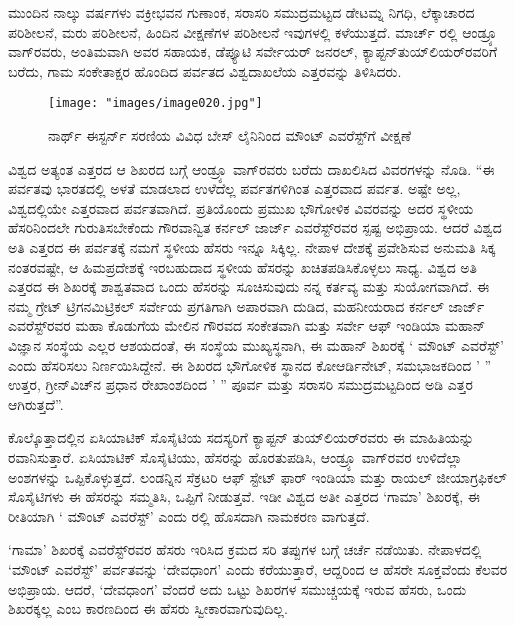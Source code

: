 ಮುಂದಿನ ನಾಲ್ಕು ವರ್ಷಗಳು ವಕ್ರೀಭವನ ಗುಣಾಂಕ, ಸರಾಸರಿ ಸಮುದ್ರಮಟ್ಟದ ಡೇಟಮ್ನ ನಿಗಧಿ, ಲೆಕ್ಕಾಚಾರದ ಪರಿಶೀಲನೆ, ಮರು ಪರಿಶೀಲನೆ, ಹಿಂದಿನ ವೀಕ್ಷಣೆಗಳ ಪರಿಶೀಲನೆ ಇವುಗಳಲ್ಲಿ ಕಳೆಯುತ್ತದೆ. ಮಾರ್ಚ್ ರಲ್ಲಿ ಆಂಡ್ರ್ಯೂ ವಾಗ್​ರವರು, ಅಂತಿಮವಾಗಿ ಅವರ ಸಹಾಯಕ, ಡೆಪ್ಯೂಟಿ ಸರ್ವೇಯರ್​ ಜನರಲ್​, ಕ್ಯಾಪ್ಟನ್​ ತುಯ್​ಲಿಯರ್​\break ರವರಿಗೆ ಬರೆದು, ಗಾಮ ಸಂಕೇತಾಕ್ಷರ ಹೊಂದಿದ ಪರ್ವತದ ವಿಶ್ವದಾಖಲೆಯ ಎತ್ತರವನ್ನು ತಿಳಿಸಿದರು.

\begin{figure}[!htbp]
\texttt{[image: "images/image020.jpg"]}
\caption{ನಾರ್ಥ್ ಈಸ್ಟರ್ನ್ ಸರಣಿಯ ವಿವಿಧ ಬೇಸ್​ ಲೈನಿನಿಂದ ಮೌಂಟ್​ ಎವರೆಸ್ಟ್​ಗೆ ವೀಕ್ಷಣೆ}\label{art15-fig2}
\end{figure}

ವಿಶ್ವದ ಅತ್ಯಂತ ಎತ್ತರದ ಆ ಶಿಖರದ ಬಗ್ಗೆ ಆಂಡ್ರ್ಯೂ ವಾಗ್​ರವರು ಬರೆದು ದಾಖಲಿಸಿದ ವಿವರಗಳನ್ನು ನೊಡಿ. “ಈ ಪರ್ವತವು ಭಾರತದಲ್ಲಿ ಅಳತೆ ಮಾಡಲಾದ ಉಳೆದೆಲ್ಲ ಪರ್ವತಗಳಿಗಿಂತ ಎತ್ತರವಾದ ಪರ್ವತ. ಅಷ್ಟೇ ಅಲ್ಲ, ವಿಶ್ವದಲ್ಲಿಯೇ ಎತ್ತರವಾದ ಪರ್ವತವಾಗಿದೆ. ಪ್ರತಿಯೊಂದು ಪ್ರಮುಖ ಭೌಗೋಳಿಕ ವಿವರವನ್ನು ಅದರ ಸ್ಥಳೀಯ ಹೆಸರಿನಿಂದಲೇ ಗುರುತಿಸಬೇಕೆಂದು ಗೌರವಾನ್ವಿತ ಕರ್ನಲ್​ ಜಾರ್ಜ್ ಎವರೆಸ್ಟ್​ರವರ ಸ್ಪಷ್ಟ ಅಭಿಪ್ರಾಯ. ಆದರೆ ವಿಶ್ವದ ಅತಿ ಎತ್ತರದ ಈ ಪರ್ವತಕ್ಕೆ ನಮಗೆ ಸ್ಥಳೀಯ ಹೆಸರು ಇನ್ನೂ ಸಿಕ್ಕಿಲ್ಲ. ನೇಪಾಳ ದೇಶಕ್ಕೆ ಪ್ರವೇಶಿಸುವ ಅನುಮತಿ ಸಿಕ್ಕ ನಂತರವಷ್ಟೇ, ಆ ಹಿಮಪ್ರದೇಶಕ್ಕೆ ಇರಬಹುದಾದ ಸ್ಥಳೀಯ ಹೆಸರನ್ನು ಖಚಿತಪಡಿಸಿಕೊಳ್ಳಲು ಸಾಧ್ಯ. ವಿಶ್ವದ ಅತಿ ಎತ್ತರದ ಈ ಶಿಖರಕ್ಕೆ ಶಾಶ್ವತವಾದ ಒಂದು ಹೆಸರನ್ನು ಸೂಚಿಸುವುದು ನನ್ನ ಕರ್ತವ್ಯ ಮತ್ತು ಸುಯೋಗವಾಗಿದೆ. ಈ ನಮ್ಮ ಗ್ರೇಟ್​ ಟ್ರಿಗನಮಿಟ್ರಿಕಲ್​ ಸರ್ವೇಯ ಪ್ರಗತಿಗಾಗಿ ಅಪಾರವಾಗಿ ದುಡಿದ, ಮಹನೀಯರಾದ ಕರ್ನಲ್​ ಜಾರ್ಜ್ ಎವರೆಸ್ಟ್​ರವರ ಮಹಾ ಕೊಡುಗೆಯ ಮೇಲಿನ ಗೌರವದ ಸಂಕೇತವಾಗಿ ಮತ್ತು ಸರ್ವೇ ಆಫ್​ ಇಂಡಿಯಾ ಮಹಾನ್​ ವಿಜ್ಞಾನ ಸಂಸ್ಥೆಯ ಎಲ್ಲರ ಆಶಯದಂತೆ, ಈ ಸಂಸ್ಥೆಯ ಮುಖ್ಯಸ್ಥನಾಗಿ, ಈ ಮಹಾನ್​ ಶಿಖರಕ್ಕೆ ‘ ಮೌಂಟ್​ ಎವರೆಸ್ಟ್​’ ಎಂದು ಹೆಸರಿಸಲು ನಿರ್ಣಯಿಸಿದ್ದೇನೆ. ಈ ಶಿಖರದ ಭೌಗೋಳಿಕ ಸ್ಥಾನದ ಕೋಆರ್ಡಿನೇಟ್​, ಸಮಭಾಜಕದಿಂದ ’ ” ಉತ್ತರ, ಗ್ರೀನ್​ವಿಚ್​ನ ಪ್ರಧಾನ ರೇಖಾಂಶದಿಂದ ’ ” ಪೂರ್ವ ಮತ್ತು ಸರಾಸರಿ ಸಮುದ್ರಮಟ್ಟದಿಂದ  ಅಡಿ ಎತ್ತರ ಆಗಿರುತ್ತದೆ”.

ಕೊಲ್ಕೊತ್ತಾದಲ್ಲಿನ ಏಸಿಯಾಟಿಕ್​ ಸೊಸೈಟಿಯ ಸದಸ್ಯರಿಗೆ ಕ್ಯಾಪ್ಟನ್​ ತುಯ್​ಲಿಯರ್​ರವರು ಈ ಮಾಹಿತಿಯನ್ನು ರವಾನಿಸುತ್ತಾರೆ. ಏಸಿಯಾಟಿಕ್​ ಸೊಸೈಟಿಯು, ಹೆಸರನ್ನು ಹೊರತುಪಡಿಸಿ, ಆಂಡ್ರ್ಯೂ ವಾಗ್​ರವರ ಉಳಿದೆಲ್ಲಾ ಅಂಶಗಳನ್ನು ಒಪ್ಪಿಕೊಳ್ಳುತ್ತದೆ. ಲಂಡನ್ನಿನ ಸೆಕ್ರಟರಿ ಆಫ್​ ಸ್ಟೇಟ್​ ಫಾರ್​ ಇಂಡಿಯಾ ಮತ್ತು ರಾಯಲ್​ ಜೀಯಾಗ್ರಫಿಕಲ್​ ಸೊಸೈಟಿಗಳು ಈ ಹೆಸರನ್ನು ಸಮ್ಮತಿಸಿ, ಒಪ್ಪಿಗೆ ನೀಡುತ್ತವೆ. ಇಡೀ ವಿಶ್ವದ ಅತೀ ಎತ್ತರದ ‘ಗಾಮಾ’ ಶಿಖರಕ್ಕೆ, ಈ ರೀತಿಯಾಗಿ ‘ ಮೌಂಟ್​ ಎವರೆಸ್ಟ್​’ ಎಂದು  ರಲ್ಲಿ ಹೊಸದಾಗಿ ನಾಮಕರಣ ವಾಗುತ್ತದೆ.

‘ಗಾಮಾ’ ಶಿಖರಕ್ಕೆ ಎವರೆಸ್ಟ್​ರವರ ಹೆಸರು ಇರಿಸಿದ ಕ್ರಮದ ಸರಿ ತಪ್ಪುಗಳ ಬಗ್ಗೆ ಚರ್ಚೆ ನಡೆಯಿತು. ನೇಪಾಳದಲ್ಲಿ `ಮೌಂಟ್​ ಎವರೆಸ್ಟ್​’ ಪರ್ವತವನ್ನು ‘ದೇವಧಾಂಗ’ ಎಂದು ಕರೆಯುತ್ತಾರೆ, ಆದ್ದರಿಂದ ಆ ಹೆಸರೇ ಸೂಕ್ತವೆಂದು ಕೆಲವರ ಅಭಿಪ್ರಾಯ. ಆದರೆ, ‘ದೇವಧಾಂಗ’ ವೆಂದರೆ ಅದು ಒಟ್ಟು ಶಿಖರಗಳ ಸಮುಚ್ಚಯಕ್ಕೆ ಇರುವ ಹೆಸರು, ಒಂದು ಶಿಖರಕ್ಕಲ್ಲ ಎಂಬ ಕಾರಣದಿಂದ ಈ ಹೆಸರು ಸ್ವೀಕಾರವಾಗುವುದಿಲ್ಲ.

